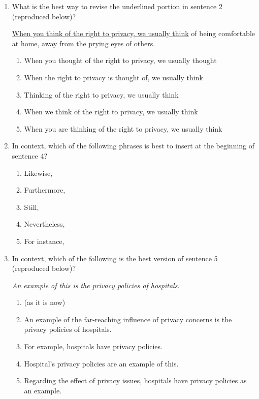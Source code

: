 \documentclass[12pt]{book}
\begin{document}
\begin{enumerate}
\item{What is the best way to revise the underlined portion in sentence 2 (reproduced below)?}

\ul{When you think of the right to privacy, we usually think} of being comfortable at home, away from the prying eyes of others.
\begin{enumerate}[label=(\Alph*)]
\item{When you thought of the right to privacy, we usually thought}
\item{When the right to privacy is thought of, we usually think}
\item{Thinking of the right to privacy, we usually think}
\item{When we think of the right to privacy, we usually think}
\item{When you are thinking of the right to privacy, we usually think}
\end{enumerate}

\newpage
\item{In context, which of the following phrases is best to insert at the beginning of sentence 4?}
\begin{enumerate}[label=(\Alph*)]
\item{Likewise,}
\item{Furthermore,}
\item{Still,}
\item{Nevertheless,}
\item{For instance,}
\end{enumerate}

\bigskip
\item{In context, which of the following is the best version of sentence 5 (reproduced below)?}

\bigskip
\textit{An example of this is the privacy policies of hospitals.}
\begin{enumerate}[label=(\Alph*)]
\item{(as it is now)}
\item{An example of the far-reaching influence of privacy concerns is the privacy policies of hospitals.}
\item{For example, hospitals have privacy policies.}
\item{Hospital's privacy policies are an example of this.}
\item{Regarding the effect of privacy issues, hospitals have privacy policies as an example.}
\end{enumerate}


\end{enumerate}
\end{document}
